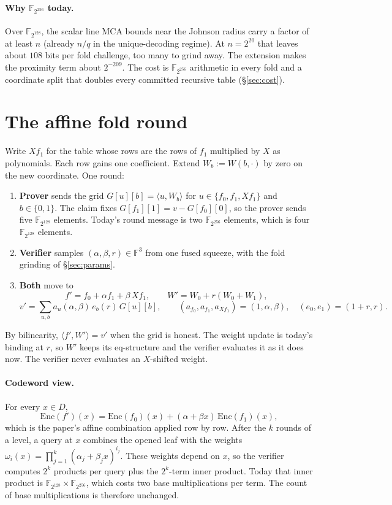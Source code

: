 \documentclass[11pt]{article}
\newcommand{\F}{\mathbb{F}}
\begin{document}
\paragraph{Why $\F_{2^{256}}$ today.} Over $\F_{2^{128}}$, the scalar
line MCA bounds near the Johnson radius carry a factor of at least $n$
(already $n/q$ in the unique-decoding regime). At $n = 2^{20}$ that
leaves about $108$ bits per fold challenge, too many to grind away.
The extension makes the proximity term about $2^{-209}$. The cost is
$\F_{2^{256}}$ arithmetic in every fold and a coordinate split that
doubles every committed recursive table
(\S\ref{sec:cost}).

\section{The affine fold round}\label{sec:round}

Write $Xf_1$ for the table whose rows are the rows of $f_1$ multiplied
by $X$ as polynomials. Each row gains one coefficient. Extend $W_b :=
W(b, \cdot)$ by zero on the new coordinate. One round:

\begin{enumerate}[leftmargin=2em]
\item \textbf{Prover} sends the grid $G[u][b] = \langle u, W_b\rangle$
  for $u \in \{f_0, f_1, Xf_1\}$ and $b \in \{0,1\}$. The claim fixes
  $G[f_1][1] = v - G[f_0][0]$, so the prover sends five
  $\F_{2^{128}}$ elements. Today's round message is two
  $\F_{2^{256}}$ elements, which is four $\F_{2^{128}}$ elements.
\item \textbf{Verifier} samples $(\alpha, \beta, r) \in \F^3$ from one
  fused squeeze, with the fold grinding of \S\ref{sec:params}.
\item \textbf{Both} move to
  \[
    f' = f_0 + \alpha f_1 + \beta\, Xf_1, \qquad
    W' = W_0 + r(W_0 + W_1),
  \]
  \[
    v' = \textstyle\sum_{u, b} a_u(\alpha, \beta)\, e_b(r)\, G[u][b],
    \qquad (a_{f_0}, a_{f_1}, a_{Xf_1}) = (1, \alpha, \beta), \quad
    (e_0, e_1) = (1 + r, r).
  \]
\end{enumerate}
By bilinearity, $\langle f', W'\rangle = v'$ when the grid is honest.
The weight update is today's binding at $r$, so $W'$ keeps its
eq-structure and the verifier evaluates it as it does now. The
verifier never evaluates an $X$-shifted weight.

\paragraph{Codeword view.} For every $x \in D$,
\[
  \mathrm{Enc}(f')(x) = \mathrm{Enc}(f_0)(x) + (\alpha + \beta x)\,
  \mathrm{Enc}(f_1)(x),
\]
which is the paper's affine combination applied row by row. After the
$k$ rounds of a level, a query at $x$ combines the opened leaf with the
weights $\omega_i(x) = \prod_{j=1}^{k} (\alpha_j + \beta_j x)^{i_j}$.
These weights depend on $x$, so the verifier computes $2^k$ products
per query plus the $2^k$-term inner product. Today that inner product
is $\F_{2^{128}} \times \F_{2^{256}}$, which costs two base
multiplications per term. The count of base multiplications is
therefore unchanged.
\end{document}
